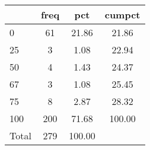 {
\def\sym#1{\ifmmode^{#1}\else\(^{#1}\)\fi}
\begin{tabular}{l*{1}{ccc}}
\hline\hline
            &        freq&         pct&      cumpct\\
\hline
0           &          61&       21.86&       21.86\\
25          &           3&        1.08&       22.94\\
50          &           4&        1.43&       24.37\\
67          &           3&        1.08&       25.45\\
75          &           8&        2.87&       28.32\\
100         &         200&       71.68&      100.00\\
Total       &         279&      100.00&            \\
\hline\hline
\end{tabular}
}
